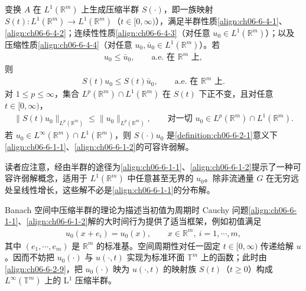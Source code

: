 \documentclass[../../main.tex]{subfiles}
\begin{document}
\begin{theorem}\label{theorem:ch06-6-4-8}
变换 $A$ 在 $L^{1}(\mathbb{R}^{m})$ 上生成压缩半群 $S(\cdot)$，即一族映射 $S(t)\colon L^{1}(\mathbb{R}^{m})\to L^{1}(\mathbb{R}^{m})$（$t\in[0,\infty)$），满足半群性质\eqref{align:ch06-6-4-1}、\eqref{align:ch06-6-4-2}；连续性性质\eqref{align:ch06-6-4-3}（对任意 $u_{0}\in L^{1}(\mathbb{R}^{m})$）；以及压缩性质\eqref{align:ch06-6-4-4}（对任意 $u_{0},\bar{u}_{0}\in L^{1}(\mathbb{R}^{m})$）。若
\begin{align}
u_{0}\leqslant\bar{u}_{0},\qquad\text{a.e.\ 在 }\mathbb{R}^{m}\text{ 上},
\label{align:ch06-6-4-32}
\end{align}
则
\begin{align}
S(t)u_{0}\leqslant S(t)\bar{u}_{0},\qquad\text{a.e.\ 在 }\mathbb{R}^{m}\text{ 上}.
\label{align:ch06-6-4-33}
\end{align}
对 $1\leqslant p\leqslant\infty$，集合 $L^{p}(\mathbb{R}^{m})\cap L^{1}(\mathbb{R}^{m})$ 在 $S(t)$ 下正不变，且对任意 $t\in[0,\infty)$，
\begin{align}
\|S(t)u_{0}\|_{L^{p}(\mathbb{R}^{m})}\leqslant\|u_{0}\|_{L^{p}(\mathbb{R}^{m})},\qquad\text{对一切 }u_{0}\in L^{p}(\mathbb{R}^{m})\cap L^{1}(\mathbb{R}^{m}).
\label{align:ch06-6-4-34}
\end{align}
若 $u_{0}\in L^{\infty}(\mathbb{R}^{m})\cap L^{1}(\mathbb{R}^{m})$，则 $S(\cdot)u_{0}$ 是\cref{definition:ch06-6-2-1}意义下\eqref{align:ch06-6-1-1}、\eqref{align:ch06-6-1-2}的可容许弱解。
\end{theorem}

读者应注意，经由半群的途径为\eqref{align:ch06-6-1-1}、\eqref{align:ch06-6-1-2}提示了一种可容许弱解概念，适用于 $L^{1}(\mathbb{R}^{m})$ 中任意甚至无界的 $u_{0}$。除非流通量 $G$ 在无穷远处呈线性增长，这些解不必是\eqref{align:ch06-6-1-1}的分布解。

Banach 空间中压缩半群的理论为描述当初值为周期时 Cauchy 问题\eqref{align:ch06-6-1-1}、\eqref{align:ch06-6-1-2}解的大时间行为提供了适当框架，例如初值满足
\begin{align}
u_{0}(x+e_{i})=u_{0}(x),\qquad x\in\mathbb{R}^{m},\ i=1,\cdots,m,
\label{align:ch06-6-4-35}
\end{align}
其中 $(e_{1},\cdots,e_{m})$ 是 $\mathbb{R}^{m}$ 的标准基。空间周期性对任一固定 $t\in[0,\infty)$ 传递给解 $u$。因而不妨把 $u_{0}(\cdot)$ 与 $u(\cdot,t)$ 实现为标准环面 $\mathbb{T}^{m}$ 上的函数；此时由\eqref{align:ch06-6-2-9}，把 $u_{0}(\cdot)$ 映为 $u(\cdot,t)$ 的映射族 $S(t)$（$t\geqslant 0$）构成 $L^{\infty}(\mathbb{T}^{m})$ 上的 L$^{1}$ 压缩半群。
\end{document}
